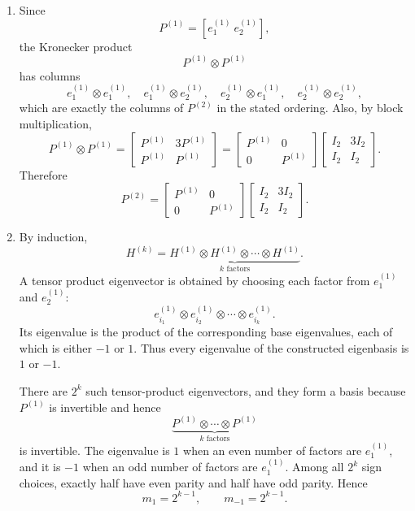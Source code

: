 \documentclass[12pt]{article}
\begin{document}
\begin{enumerate}[label=(\alph*)]
  \item Since
  \[
  P^{(1)}=[e_1^{(1)}\ e_2^{(1)}],
  \]
  the Kronecker product
  \[
  P^{(1)}\otimes P^{(1)}
  \]
  has columns
  \[
  e_1^{(1)}\otimes e_1^{(1)},
  \quad
  e_1^{(1)}\otimes e_2^{(1)},
  \quad
  e_2^{(1)}\otimes e_1^{(1)},
  \quad
  e_2^{(1)}\otimes e_2^{(1)},
  \]
  which are exactly the columns of $P^{(2)}$ in the stated ordering. Also, by block multiplication,
  \[
  P^{(1)}\otimes P^{(1)}
  =\begin{bmatrix}P^{(1)}&3P^{(1)}\\P^{(1)}&P^{(1)}\end{bmatrix}
  =\begin{bmatrix}P^{(1)}&0\\0&P^{(1)}\end{bmatrix}
  \begin{bmatrix}I_2&3I_2\\I_2&I_2\end{bmatrix}.
  \]
  Therefore
  \[
  \boxed{P^{(2)}=\begin{bmatrix}P^{(1)}&0\\0&P^{(1)}\end{bmatrix}
  \begin{bmatrix}I_2&3I_2\\I_2&I_2\end{bmatrix}.}
  \]

  \item By induction,
  \[
  H^{(k)}=\underbrace{H^{(1)}\otimes H^{(1)}\otimes\cdots\otimes H^{(1)}}_{k\text{ factors}}.
  \]
  A tensor product eigenvector is obtained by choosing each factor from $e_1^{(1)}$ and $e_2^{(1)}$:
  \[
  e_{i_1}^{(1)}\otimes e_{i_2}^{(1)}\otimes\cdots\otimes e_{i_k}^{(1)}.
  \]
  Its eigenvalue is the product of the corresponding base eigenvalues, each of which is either $-1$ or $1$. Thus every eigenvalue of the constructed eigenbasis is $1$ or $-1$.

  There are $2^k$ such tensor-product eigenvectors, and they form a basis because $P^{(1)}$ is invertible and hence
  \[
  \underbrace{P^{(1)}\otimes\cdots\otimes P^{(1)}}_{k\text{ factors}}
  \]
  is invertible. The eigenvalue is $1$ when an even number of factors are $e_1^{(1)}$, and it is $-1$ when an odd number of factors are $e_1^{(1)}$. Among all $2^k$ sign choices, exactly half have even parity and half have odd parity. Hence
  \[
  \boxed{m_1=2^{k-1},
  \qquad
  m_{-1}=2^{k-1}.}
  \]
\end{enumerate}

\newpage
\end{document}
